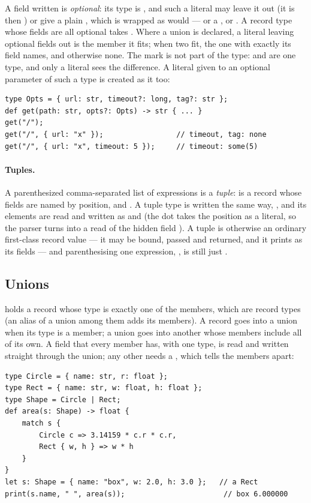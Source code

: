 A field written  is \emph{optional}: its type is ,
and such a literal may leave it out (it is then ) or give a
plain , which is wrapped as  would --- or a , or
. A record type whose fields are all optional takes \ic{\{\}}.
Where a union is declared, a literal leaving optional fields out is the
member it fits; when two fit, the one with exactly its field names, and
otherwise none. The mark is not part of the type:
 and  are one type, and only a
literal sees the difference. A literal given to an optional parameter
of such a type is created as it too:

\begin{lstlisting}
type Opts = { url: str, timeout?: long, tag?: str };
def get(path: str, opts?: Opts) -> str { ... }
get("/");
get("/", { url: "x" });                 // timeout, tag: none
get("/", { url: "x", timeout: 5 });     // timeout: some(5)
\end{lstlisting}

\paragraph{Tuples.} A parenthesized comma-separated list of expressions is
a \emph{tuple}:  is a record whose fields are named by
position,  and . A tuple type is written the same way,
, and its elements are read and written as  and
 (the dot takes the position as a literal, so the parser turns
 into a read of the hidden field ). A tuple is otherwise an
ordinary first-class record value --- it may be bound, passed and
returned, and it prints as its fields --- and parenthesising one
expression, , is still just .

\subsection{Unions}
\label{sec:type-unions}

 holds a record whose type is exactly one of the members, which
are record types (an alias of a union among them adds its members). A
record goes into a union when its type is a member; a union goes into
another whose members include all of its own. A field that every member
has, with one type, is read and written straight through the union; any
other needs a , which tells the members apart:

\begin{lstlisting}
type Circle = { name: str, r: float };
type Rect = { name: str, w: float, h: float };
type Shape = Circle | Rect;
def area(s: Shape) -> float {
    match s {
        Circle c => 3.14159 * c.r * c.r,
        Rect { w, h } => w * h
    }
}
let s: Shape = { name: "box", w: 2.0, h: 3.0 };   // a Rect
print(s.name, " ", area(s));                       // box 6.000000
\end{lstlisting}

